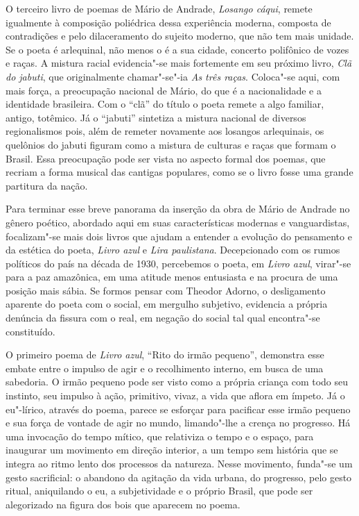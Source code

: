 O terceiro livro de poemas de Mário de Andrade, \textit{Losango cáqui}, remete igualmente à composição poliédrica dessa experiência moderna, composta de contradições e pelo dilaceramento do sujeito moderno, que não tem mais unidade.
Se o poeta é arlequinal, não menos o é a sua cidade, concerto polifônico de vozes e raças. A mistura racial evidencia"-se mais fortemente em seu próximo livro, \textit{Clã do jabuti}, que originalmente chamar"-se"-ia \textit{As três raças}.
Coloca"-se aqui, com mais força, a preocupação nacional de Mário, do que é a nacionalidade e a identidade brasileira. Com o ``clã'' do título o poeta remete a algo familiar, antigo, totêmico. Já o ``jabuti'' sintetiza a mistura nacional de diversos regionalismos pois, além de remeter novamente aos losangos arlequinais, os quelônios do jabuti figuram como a mistura de culturas e raças que formam o Brasil. Essa preocupação pode ser vista no aspecto formal dos poemas, que recriam a forma musical das cantigas populares, como se o livro fosse uma grande partitura da nação.

Para terminar esse breve panorama da inserção da obra de Mário de Andrade no gênero poético, abordado aqui em suas características modernas e vanguardistas, focalizam"-se mais dois livros que ajudam a entender a evolução do pensamento e da estética do poeta, \textit{Livro azul} e \textit{Lira paulistana}.
Decepcionado com os rumos políticos do país na década de 1930, percebemos o poeta, em \textit{Livro azul}, virar"-se para a paz amazônica, em uma atitude menos entusiasta e na procura de uma posição mais sábia. 
Se formos pensar com Theodor Adorno, o desligamento aparente do poeta com o social, em mergulho subjetivo, evidencia a própria denúncia da fissura com o real, em negação do social tal qual encontra"-se constituído.

O primeiro poema de \textit{Livro azul}, ``Rito do irmão pequeno'', demonstra esse embate entre o impulso de agir e o recolhimento interno, em busca de uma sabedoria. O irmão pequeno pode ser visto como a própria criança com todo seu instinto, seu impulso à ação, primitivo, vivaz, a vida que aflora em ímpeto. Já o eu"-lírico, através do poema, parece se esforçar para pacificar esse irmão pequeno e sua força de vontade de agir no mundo, limando"-lhe a crença no progresso.
Há uma invocação do tempo mítico, que relativiza o tempo e o espaço, para inaugurar um movimento em direção interior, a um tempo sem história que se integra ao ritmo lento dos processos da natureza. Nesse movimento, funda"-se um gesto sacrificial: o abandono da agitação da vida urbana, do progresso, pelo gesto ritual, aniquilando o eu, a subjetividade e o próprio Brasil, que pode ser alegorizado na figura dos bois que aparecem no poema.

